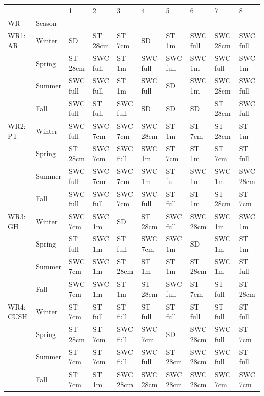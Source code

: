 \begin{tabular}{llllllllll}
\toprule
          &      &         1 &         2 &         3 &         4 &         5 &         6 &         7 &         8 \\
WR & Season &           &           &           &           &           &           &           &           \\
\midrule
WR1: AR & Winter &        SD &   ST 28cm &    ST 7cm &        SD &     ST 1m &  SWC full &  SWC 28cm &  SWC full \\
          & Spring &   ST 28cm &  SWC full &     ST 1m &  SWC full &  SWC full &    SWC 1m &  SWC full &    SWC 1m \\
          & Summer &  SWC full &  SWC full &     ST 1m &  SWC full &        SD &    SWC 1m &  SWC 28cm &  SWC full \\
          & Fall &  SWC full &   ST full &  SWC full &        SD &        SD &        SD &   ST 28cm &  SWC full \\
WR2: PT & Winter &  SWC full &   SWC 7cm &   SWC 7cm &  SWC 28cm &     ST 1m &    ST 7cm &   ST 28cm &     ST 1m \\
          & Spring &   ST 28cm &   SWC 7cm &  SWC full &    SWC 1m &    ST 7cm &     ST 1m &    ST 7cm &   ST full \\
          & Summer &  SWC full &   SWC 7cm &   SWC 7cm &    SWC 1m &   ST full &    SWC 1m &    SWC 1m &  SWC 28cm \\
          & Fall &  SWC full &  SWC full &   SWC 7cm &  SWC full &   ST full &     ST 1m &   ST 28cm &    ST 7cm \\
WR3: GH & Winter &   SWC 7cm &    SWC 1m &        SD &   ST 28cm &  SWC full &  SWC 28cm &    SWC 1m &    SWC 1m \\
          & Spring &   ST full &    SWC 1m &   ST full &   SWC 7cm &    SWC 1m &        SD &    SWC 1m &     ST 1m \\
          & Summer &   SWC 7cm &    SWC 1m &   ST 28cm &     ST 1m &     ST 1m &   ST 28cm &    SWC 1m &   ST full \\
          & Fall &   SWC 7cm &    SWC 1m &     ST 1m &   ST 28cm &  SWC full &    ST 7cm &   ST full &   ST 28cm \\
WR4: CUSH & Winter &    ST 7cm &   ST full &   ST full &   ST full &   ST full &   ST full &   ST full &   ST full \\
          & Spring &   ST 28cm &    ST 7cm &  SWC full &   SWC 7cm &        SD &  SWC 28cm &  SWC full &    ST 7cm \\
          & Summer &    ST 7cm &    ST 7cm &  SWC full &  SWC full &   ST 28cm &  SWC 28cm &  SWC full &   ST full \\
          & Fall &    ST 7cm &     ST 1m &  SWC 28cm &  SWC 28cm &  SWC 28cm &  SWC 28cm &   SWC 7cm &   SWC 7cm \\
\bottomrule
\end{tabular}
